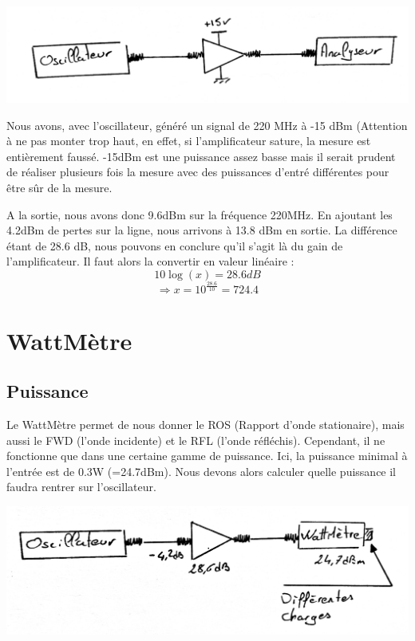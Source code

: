 \documentclass[a4paper,12pt]{report}            %
\begin{document}
\begin{center}\includegraphics[scale = 0.3]{pic/montage_ampli.png}\\ \end{center}

Nous avons, avec l'oscillateur, généré un signal de 220 MHz à -15 dBm (Attention à ne pas monter trop haut, en 
effet, si l'amplificateur sature, la mesure est entièrement faussé. -15dBm est une puissance assez basse mais il
serait prudent de réaliser plusieurs fois la mesure avec des puissances d'entré différentes pour être sûr de 
la mesure.

A la sortie, nous avons donc 9.6dBm sur la fréquence 220MHz. En ajoutant les 4.2dBm de pertes sur la ligne, nous arrivons
à 13.8 dBm en sortie. La différence étant de 28.6 dB, nous pouvons en conclure qu'il s'agit là du gain de l'amplificateur.
Il faut alors la convertir en valeur linéaire :\\
$$10 \log (x) = 28.6 dB$$
$$\Rightarrow x = 10^{\frac{28.6}{10}}=724.4 $$

\chapter{WattMètre}

\section{Puissance}

Le WattMètre permet de nous donner le ROS (Rapport d'onde stationaire), mais aussi le FWD (l'onde incidente) et le
RFL (l'onde réfléchis). Cependant, il ne fonctionne que dans une certaine gamme de puissance. Ici, la puissance minimal
à l'entrée est de 0.3W (=24.7dBm). Nous devons alors calculer quelle puissance il faudra rentrer sur l'oscillateur.

\begin{center}\includegraphics[scale = 0.25]{pic/montage_wattmetre.png}\\ \end{center}
\end{document}
